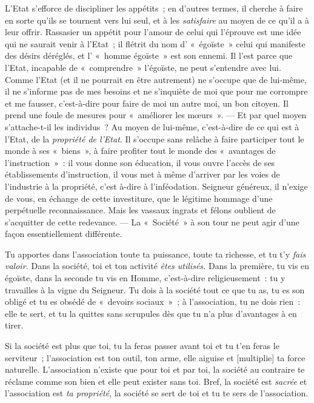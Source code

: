 \documentclass[french,twoside]{book} %
\newcommand\corr[1]{#1}
\begin{document}
L’Etat s’efforce de discipliner les appétits ; en d’autres termes, il cherche à faire en sorte qu’ils se tournent vers lui seul, et à les \emph{satisfaire} au moyen de ce qu’il a à leur offrir. Rassasier un appétit pour l’amour de celui qui l’éprouve est une idée qui ne saurait venir à l’Etat ; il flétrit du nom d’ « égoïste » celui qui manifeste des désirs déréglés, et l’ « homme égoïste » est son ennemi. Il l’est parce que l’Etat, incapable de « comprendre » l’égoïste, ne peut s’entendre avec lui. Comme l’Etat (et il ne pourrait en être autrement) ne s’occupe que de lui-même, il ne s’informe pas de mes besoins et ne s’inquiète de moi que pour me corrompre et me fausser, c’est-à-dire pour faire de moi un autre moi, un bon citoyen. Il prend une foule de mesures pour « améliorer les mœurs ». — Et par quel moyen s’attache-t-il les individus ? Au moyen de lui-même, c’est-à-dire de ce qui est à l’Etat, de la \emph{propriété de l’Etat}. Il s’occupe sans relâche à faire participer tout le monde à ses « biens », à faire profiter tout le monde des « avantages de l’instruction » : il vous donne son éducation, il vous ouvre l’accès de ses établissements d’instruction, il vous met à même d’arriver par les voies de l’industrie à la propriété, c’est à-dire à l’inféodation. Seigneur généreux, il n’exige de vous, en échange de cette investiture, que le légitime hommage d’une perpétuelle reconnaissance. Mais les vassaux ingrats et félons oublient de s’acquitter de cette redevance. — La « Société » à son tour ne peut agir d’une façon essentiellement différente.\par
Tu apportes dans l’association toute ta puissance, toute ta richesse, et tu t’y \emph{fais valoir.} Dans la société, toi et ton activité \emph{êtes utilisés.} Dans la première, tu vis en égoïste, dans la seconde tu vis en Homme,  c’est-à-dire religieusement : tu y travailles à la vigne du Seigneur. Tu dois à la société tout ce que tu as, tu es son obligé et tu es obsédé de « devoirs sociaux » ; à l’association, tu ne dois rien : elle te sert, et tu la quittes sans scrupules dès que tu n’a plus d’avantages à en tirer.\par
Si la société est plus que toi, tu la feras passer avant toi et tu t’en feras le serviteur ; l’association est ton outil, ton arme, elle aiguise et [{\corr multiplie}] ta force naturelle. L’association n’existe que pour toi et par toi, la société au contraire te réclame comme son bien et elle peut exister sans toi. Bref, la société est \emph{sacrée} et l’association est \emph{ta propriété}, la société se sert de toi et tu te sers de l’association.\par
\end{document}
